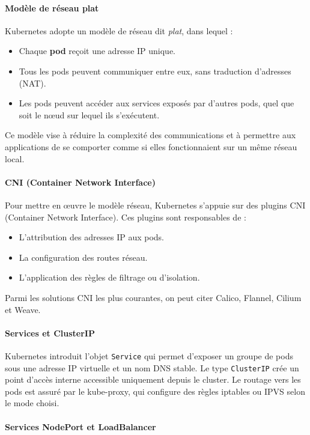 \paragraph{Modèle de réseau plat}

Kubernetes adopte un modèle de réseau dit \emph{plat}, dans lequel :
\begin{itemize}
	\item Chaque \textbf{pod} reçoit une adresse IP unique.
	\item Tous les pods peuvent communiquer entre eux, sans traduction d’adresses (NAT).
	\item Les pods peuvent accéder aux services exposés par d’autres pods, quel que soit le nœud sur lequel ils s’exécutent.
\end{itemize}
Ce modèle vise à réduire la complexité des communications et à permettre aux applications de se comporter comme si elles fonctionnaient sur un même réseau local.

\paragraph{CNI (Container Network Interface)}

Pour mettre en œuvre le modèle réseau, Kubernetes s’appuie sur des plugins CNI (Container Network Interface).
Ces plugins sont responsables de :
\begin{itemize}
	\item L’attribution des adresses IP aux pods.
	\item La configuration des routes réseau.
	\item L’application des règles de filtrage ou d’isolation.
\end{itemize}
Parmi les solutions CNI les plus courantes, on peut citer Calico, Flannel, Cilium et Weave.

\paragraph{Services et ClusterIP}

Kubernetes introduit l’objet \texttt{Service} qui permet d’exposer un groupe de pods sous une adresse IP virtuelle et un nom DNS stable.
Le type \texttt{ClusterIP} crée un point d’accès interne accessible uniquement depuis le cluster.
Le routage vers les pods est assuré par le kube-proxy, qui configure des règles iptables ou IPVS selon le mode choisi.

\paragraph{Services NodePort et LoadBalancer}

